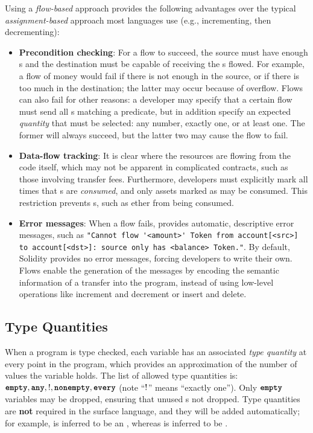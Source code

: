 \documentclass[dvipsnames, usenames, sigconf]{acmart}
\begin{document}
Using a \emph{flow-based} approach provides the following advantages over the typical \emph{assignment-based} approach most languages use (e.g., incrementing, then decrementing):
\begin{itemize}
    \item \textbf{Precondition checking}: For a flow to succeed, the source must have enough \assetTxt{}s and the destination must be capable of receiving the \assetTxt{}s flowed.
        For example, a flow of money would fail if there is not enough in the source, or if there is too much in the destination; the latter may occur because of overflow.
        Flows can also fail for other reasons: a developer may specify that a certain flow must send all \assetTxt{}s matching a predicate, but in addition specify an expected \emph{quantity} that must be selected: any number, exactly one, or at least one.
        The former will always succeed, but the latter two may cause the flow to fail.
    \item \textbf{Data-flow tracking}: It is clear where the resources are flowing from the code itself, which may not be apparent in complicated contracts, such as those involving transfer fees.
        Furthermore, developers must explicitly mark all times that \assetTxt{}s are \emph{consumed}, and only assets marked as  may be consumed.
        This restriction prevents \assetTxt{}s, such as ether from being consumed.
    \item \textbf{Error messages}: When a flow fails, \langName provides automatic, descriptive error messages, such as \lstinline{"Cannot flow '<amount>' Token from account[<src>] to account[<dst>]: source only has <balance> Token."}.
        By default, Solidity provides no error messages, forcing developers to write their own.
        Flows enable the generation of the messages by encoding the semantic information of a transfer into the program, instead of using low-level operations like increment and decrement or insert and delete.
\end{itemize}

\subsection{Type Quantities}
When a \langName program is type checked, each variable has an associated \emph{type quantity} at every point in the program, which provides an approximation of the number of values the variable holds.
The list of allowed type quantities is: $\textbf{\texttt{empty}}, \textbf{\texttt{any}}, !, \textbf{\texttt{nonempty}}, \textbf{\texttt{every}}$ (note ``$!$'' means ``exactly one'').
Only $\textbf{\texttt{empty}}$ \assetTxt variables may be dropped, ensuring that unused \assetTxt{}s not dropped.
Type quantities are \textbf{not} required in the surface language, and they will be added automatically; for example,  is inferred to be an , whereas  is inferred to be .
\end{document}
